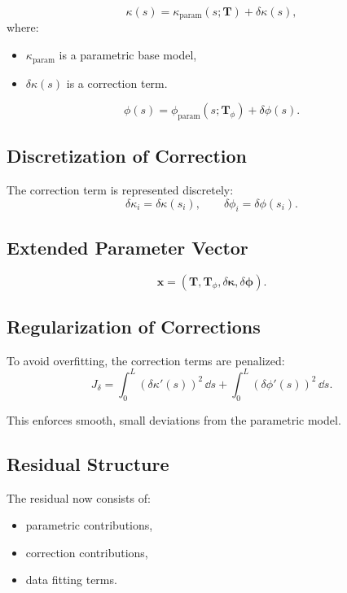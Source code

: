 \begin{definition}
\[
\kappa(s)
=
\kappa_{\mathrm{param}}(s;\mathbf{T})
+
\delta\kappa(s),
\]
where:
\begin{itemize}
\item \(\kappa_{\mathrm{param}}\) is a parametric base model,
\item \(\delta\kappa(s)\) is a correction term.
\end{itemize}
\end{definition}

\begin{definition}
\[
\phi(s)
=
\phi_{\mathrm{param}}(s;\mathbf{T}_\phi)
+
\delta\phi(s).
\]
\end{definition}


\subsection{Discretization of Correction}

The correction term is represented discretely:
\[
\delta\kappa_i = \delta\kappa(s_i),
\qquad
\delta\phi_i = \delta\phi(s_i).
\]


\subsection{Extended Parameter Vector}

\begin{definition}
\[
\mathbf{x}
=
(\mathbf{T}, \mathbf{T}_\phi, \delta\boldsymbol{\kappa}, \delta\boldsymbol{\phi}).
\]
\end{definition}


\subsection{Regularization of Corrections}

To avoid overfitting, the correction terms are penalized:
\[
J_{\delta}
=
\int_0^L (\delta\kappa'(s))^2 \,\dd s
+
\int_0^L (\delta\phi'(s))^2 \,\dd s.
\]

This enforces smooth, small deviations from the parametric model.


\subsection{Residual Structure}

The residual now consists of:
\begin{itemize}
\item parametric contributions,
\item correction contributions,
\item data fitting terms.
\end{itemize}


